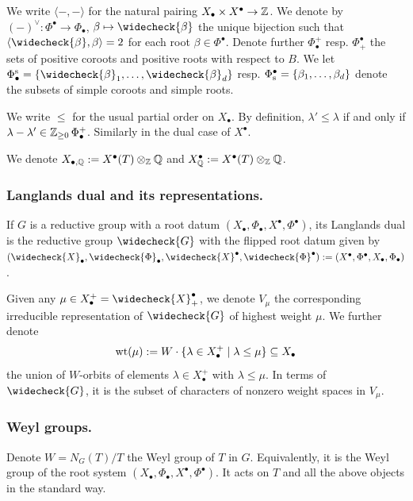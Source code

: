 %
We write $\langle -, - \rangle$ for the natural pairing $X_{\bullet} \times X^{\bullet} \to \operatorname{\mathbb{Z}}$. We denote by $(-)^\vee: \Phi^{\bullet} \to \Phi_{\bullet}$, $\beta \mapsto \widecheck{\beta}$ the unique bijection such that $\langle \widecheck{\beta}, \beta \rangle = 2$ for each root $\beta \in \Phi^{\bullet}$. Denote further $\Phi_{\bullet}^{+}$ resp. $\Phi^{\bullet}_{+}$ the sets of positive coroots and positive roots with respect to $B$. We let $\Phi_{\bullet}^{\sr} = \{\widecheck{\beta}_1, \dots, \widecheck{\beta}_d \}$ resp. $\Phi^{\bullet}_{\mathrm{s}} = \{\beta_1, \dots, \beta_d \}$ denote the subsets of simple coroots and simple roots. 

We write $\leq$ for the usual partial order on $X_{\bullet}$. By definition, $\lambda' \leq \lambda$ if and only if $\lambda - \lambda' \in \operatorname{\mathbb{Z}}_{\geq 0} \Phi^{+}_{\bullet}$. Similarly in the dual case of $X^{\bullet}$.

We denote $X_{\bullet,\operatorname{\mathbb{Q}}} := X^{\bullet}(T) \otimes_{\operatorname{\mathbb{Z}}} \operatorname{\mathbb{Q}}$ and $X^{\bullet}_{\operatorname{\mathbb{Q}}} := X^{\bullet}(T) \otimes_{\operatorname{\mathbb{Z}}} \operatorname{\mathbb{Q}}$.



\subsubsection{Langlands dual and its representations.}\label{section: lnglands dual and its representations}
If $G$ is a reductive group with a root datum $(X_{\bullet}, \Phi_{\bullet}, X^{\bullet}, \Phi^{\bullet})$, its Langlands dual is the reductive group $\widecheck{G}$ with the flipped root datum given by $(\widecheck{X}_{\bullet}, \widecheck{\Phi}_{\bullet}, \widecheck{X}^{\bullet}, \widecheck{\Phi}^{\bullet}) := (X^{\bullet}, \Phi^{\bullet}, X_{\bullet}, \Phi_{\bullet})$.

Given any $\mu \in X^{+}_{\bullet} = \widecheck{X}^{\bullet}_+$, we denote $V_{\mu}$ the corresponding irreducible representation of $\widecheck{G}$ of highest weight $\mu$. 
We further denote 
\begin{equation}\label{notation: weights in mu}
    \operatorname{wt}(\mu) := W \cdot \{ \lambda \in X^{+}_{\bullet} \mid \lambda \leq \mu \} \subseteq X_{\bullet}
\end{equation}
the union of $W$-orbits of elements $\lambda \in X^{+}_{\bullet}$ with $\lambda \leq \mu$. In terms of $\widecheck{G}$, it is the subset of characters of nonzero weight spaces in $V_{\mu}$.


\subsubsection{Weyl groups.}
Denote $W = N_G(T)/T$ the Weyl group of $T$ in $G$. Equivalently, it is the Weyl group of the root system $(X_{\bullet}, \Phi_{\bullet}, X^{\bullet}, \Phi^{\bullet})$. It acts on $T$ and all the above objects in the standard way. 

